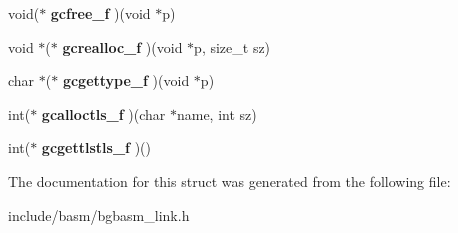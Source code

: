 \begin{DoxyCompactItemize}
\item 
\hypertarget{structBLNK__GCFuncs__t_ab041256a52a9e2cd9b157c4da503f6b7}{void($\ast$ {\bfseries gcfree\-\_\-f} )(void $\ast$p)}\label{structBLNK__GCFuncs__t_ab041256a52a9e2cd9b157c4da503f6b7}

\item 
\hypertarget{structBLNK__GCFuncs__t_ac1be8545e331194b18726f4c93327df5}{void $\ast$($\ast$ {\bfseries gcrealloc\-\_\-f} )(void $\ast$p, size\-\_\-t sz)}\label{structBLNK__GCFuncs__t_ac1be8545e331194b18726f4c93327df5}

\item 
\hypertarget{structBLNK__GCFuncs__t_ab4a2fe1a7a12073d9bef5302fbd498e6}{char $\ast$($\ast$ {\bfseries gcgettype\-\_\-f} )(void $\ast$p)}\label{structBLNK__GCFuncs__t_ab4a2fe1a7a12073d9bef5302fbd498e6}

\item 
\hypertarget{structBLNK__GCFuncs__t_aace16878faf2fa75b66624eee58aed42}{int($\ast$ {\bfseries gcalloctls\-\_\-f} )(char $\ast$name, int sz)}\label{structBLNK__GCFuncs__t_aace16878faf2fa75b66624eee58aed42}

\item 
\hypertarget{structBLNK__GCFuncs__t_af6e8a7d067857f70b9bbe600456142dd}{int($\ast$ {\bfseries gcgettlstls\-\_\-f} )()}\label{structBLNK__GCFuncs__t_af6e8a7d067857f70b9bbe600456142dd}

\end{DoxyCompactItemize}


The documentation for this struct was generated from the following file\-:\begin{DoxyCompactItemize}
\item 
include/basm/bgbasm\-\_\-link.\-h\end{DoxyCompactItemize}
